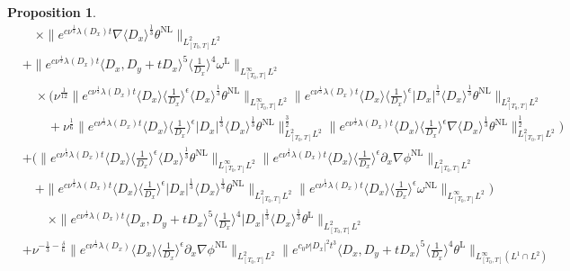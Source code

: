\documentclass[reqno, 12pt]{amsart} %
\theoremstyle{plain} %
\newtheorem{Prop}[Thm]{Proposition}
\theoremstyle{definition}
\theoremstyle{remark}
\numberwithin{equation}{section} %
\begin{document}
\begin{Prop}
{\begin{align*}
				&\quad \times \|e^{c \nu^{\frac{1}{3}} \lambda\left(D_x\right) t} \nabla \langle D_x \rangle^\frac13  \theta^{\mathrm{NL}} \|_{L_{[T_0, T]}^2 L^2} \\
				& +    \|e^{c \nu^{\frac{1}{3}} \lambda\left(D_x\right) t}\langle D_x, D_y+t D_x\rangle^5\langle\frac{1}{D_x}\rangle^4 \omega^{\mathrm{L}}\|_{L_{[T_0, T]}^\infty L^2} \\
				& \quad \times ( \nu^\frac1{12} \|e^{c \nu^{\frac{1}{3}} \lambda\left(D_x\right) t}\langle D_x\rangle\langle\frac{1}{D_x}\rangle^\epsilon \langle D_x \rangle^\frac13 \theta^{\mathrm{NL}}\|_{L_{[T_0, T]}^\infty L^2}  \| e^{c \nu^{\frac{1}{3}} \lambda\left(D_x\right) t} \langle D_x \rangle \langle\frac{1}{D_x}\rangle^\epsilon
				\left|D_x\right|^{\frac{1}{3}}  \langle D_x \rangle ^\frac13 \theta^{\mathrm{NL}} \|_{L_{[T_0, T]}^2 L^2} \\
				& \qquad + \nu^\frac16  \|e^{c \nu^{\frac{1}{3}} \lambda\left(D_x\right) t}\langle D_x\rangle\langle\frac{1}{D_x}\rangle^\epsilon\left|D_x\right|^{\frac{1}{3}}  \langle D_x \rangle^\frac13  \theta^{\mathrm{NL}}\|_{L_{[T_0, T]}^2 L^2}^{\frac{3}{2}}   \|e^{c \nu^{\frac{1}{3}} \lambda\left(D_x\right) t}\langle D_x\rangle\langle\frac{1}{D_x}\rangle^\epsilon \nabla \langle D_x \rangle^\frac13  \theta^{\mathrm{NL}}\|_{L_{[T_0, T]}^2 L^2}^{\frac{1}{2}})\\
				&+ ( \|e^{c \nu^{\frac{1}{3}} \lambda\left(D_x\right) t}\langle D_x\rangle  \langle\frac{1}{D_x}\rangle^\epsilon \langle D_x \rangle^\frac13  \theta^{\mathrm{NL}}\|_{L_{[T_0, T]}^\infty L^2}\|e^{c \nu^{\frac{1}{3}} \lambda\left(D_x\right) t}\langle D_x\rangle \langle\frac{1}{D_x}\rangle^\epsilon \partial_x \nabla \phi^{\mathrm{NL}}\|_{L_{[T_0, T]}^2 L^2}  \\
				& \quad + \|e^{c \nu^{\frac{1}{3}} \lambda\left(D_x\right) t}\langle D_x\rangle    \langle\frac{1}{D_x}\rangle^\epsilon    \left|D_x\right|^{\frac{1}{3}} \langle D_x \rangle^\frac13  \theta^{\mathrm{NL}}\|_{L_{[T_0, T]}^2 L^2}\|e^{c \nu^{\frac{1}{3}} \lambda\left(D_x\right) t}\langle D_x\rangle\langle\frac{1}{D_x}\rangle^\epsilon \omega^{\mathrm{NL}}\|_{L_{[T_0, T]}^\infty L^2} ) \\
				& \qquad \times\|e^{c \nu^{\frac{1}{3}} \lambda\left(D_x\right) t}\langle D_x, D_y+t D_x\rangle^5\langle\frac{1}{D_x}\rangle^4\left|D_x\right|^{\frac{1}{3}} \langle D_x \rangle^\frac13  \theta^{\mathrm{L}}\|_{L_{[T_0, T]}^2 L^2} \\
				&  + \nu^{-\frac{1}{3}-\frac{\delta}{6}}\|e^{c \nu^{\frac{1}{3}} \lambda\left(D_x\right)}\langle D_x\rangle\langle\frac{1}{D_x}\rangle^\epsilon \partial_x \nabla \phi^{\mathrm{NL}}\|_{L_{[T_0, T]}^2 L^2}\|e^{c_0 \nu\left|D_x\right|^2 t^3}\langle D_x, D_y+t D_x\rangle^5\langle\frac{1}{D_x}\rangle^4 \theta^{\mathrm{L}}\|_{L_{[T_0, T]}^\infty (L^1 \cap L^2)} \\

\end{align*}}
\end{Prop}
\end{document}
